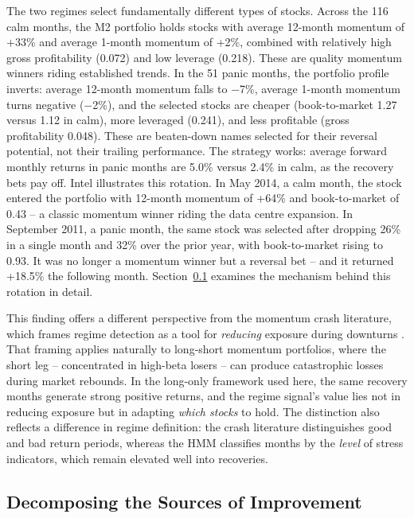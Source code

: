 The two regimes select fundamentally different types of stocks. Across the 116 calm months, the M2 portfolio holds stocks with average 12-month momentum of +33\% and average 1-month momentum of +2\%, combined with relatively high gross profitability (0.072) and low leverage (0.218). These are quality momentum winners riding established trends. In the 51 panic months, the portfolio profile inverts: average 12-month momentum falls to $-$7\%, average 1-month momentum turns negative ($-$2\%), and the selected stocks are cheaper (book-to-market 1.27 versus 1.12 in calm), more leveraged (0.241), and less profitable (gross profitability 0.048). These are beaten-down names selected for their reversal potential, not their trailing performance. The strategy works: average forward monthly returns in panic months are 5.0\% versus 2.4\% in calm, as the recovery bets pay off. Intel illustrates this rotation. In May 2014, a calm month, the stock entered the portfolio with 12-month momentum of +64\% and book-to-market of 0.43 -- a classic momentum winner riding the data centre expansion. In September 2011, a panic month, the same stock was selected after dropping 26\% in a single month and 32\% over the prior year, with book-to-market rising to 0.93. It was no longer a momentum winner but a reversal bet -- and it returned +18.5\% the following month. Section~\ref{sec:decomposition} examines the mechanism behind this rotation in detail.

This finding offers a different perspective from the momentum crash literature, which frames regime detection as a tool for \emph{reducing} exposure during downturns \citep{DanielMoskowitz2016, BarrosoSantaClara2015}. That framing applies naturally to long-short momentum portfolios, where the short leg -- concentrated in high-beta losers -- can produce catastrophic losses during market rebounds. In the long-only framework used here, the same recovery months generate strong positive returns, and the regime signal's value lies not in reducing exposure but in adapting \emph{which stocks} to hold. The distinction also reflects a difference in regime definition: the crash literature distinguishes good and bad return periods, whereas the HMM classifies months by the \emph{level} of stress indicators, which remain elevated well into recoveries.

\subsection{Decomposing the Sources of Improvement}\label{sec:decomposition}\label{sec:feature_results}\label{sec:ablation}\label{sec:context_results}

